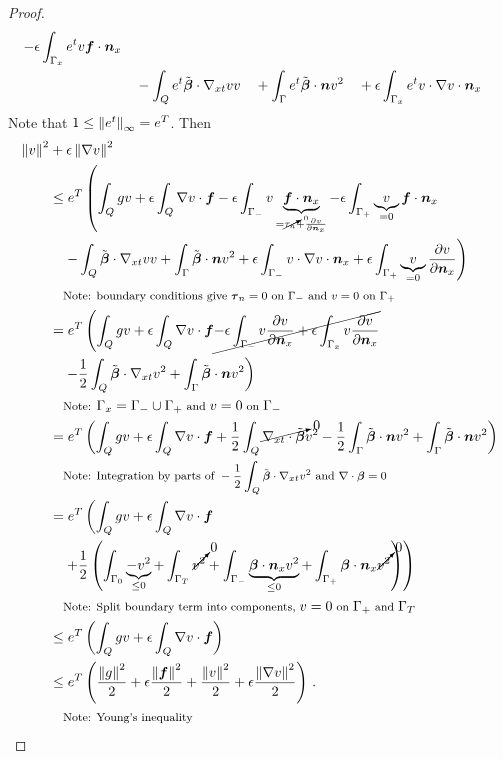 \documentclass[Dissertation.tex]{subfiles}
\begin{document}
\begin{proof}
\begin{align*}
-\epsilon\int_{\Gamma_x}e^{t}v\boldsymbol f\cdot\boldsymbol n_x\\
&\quad-\int_Qe^{t}\tilde{\boldsymbol\beta}\cdot\nabla_{xt} vv
\quad+\int_\Gamma e^{t}\tilde{\boldsymbol\beta}\cdot\boldsymbol n v^2
\quad+\epsilon\int_{\Gamma_x}e^{t}v\cdot\nabla v\cdot\boldsymbol n_x
\end{align*}
Note that $1\leq\left\| e^t \right\|_\infty=e^T$.
Then
\begin{align*}
\left\| v \right\|^2
&+\epsilon\left\| \nabla v \right\|^2
\\
&\leq
e^T\left(
\int_Qgv
+\epsilon\int_Q\nabla v\cdot\boldsymbol f
-\epsilon\int_{\Gamma_-}v\underbrace{\boldsymbol f\cdot\boldsymbol n_x}_{=\cancelto{0}{\tau_n}+\frac{\partial v}{\partial\boldsymbol n_x}}
-\epsilon\int_{\Gamma_+}\underbrace{v}_{=0}\boldsymbol f\cdot\boldsymbol n_x
\right.\\
&\left.
\quad-\int_Q\tilde{\boldsymbol\beta}\cdot\nabla_{xt} vv
+\int_\Gamma \tilde{\boldsymbol\beta}\cdot\boldsymbol n v^2
+\epsilon\int_{\Gamma_-}v\cdot\nabla v\cdot\boldsymbol n_x
+\epsilon\int_{\Gamma_+}\underbrace{v}_{=0}\frac{\partial v}{\partial\boldsymbol n_x}
\right)
\\
&\quad\footnotesize{\text{Note: boundary conditions give }\boldsymbol\tau_n=0\text{ on }\Gamma_-\text{ and }v=0\text{ on }\Gamma_+}
\\
&=
e^T\left(
\int_Qgv
+\epsilon\int_Q\nabla v\cdot\boldsymbol f
\cancel{
-\epsilon\int_{\Gamma_-}v\frac{\partial v}{\partial\boldsymbol n_x}
+\epsilon\int_{\Gamma_x}v\frac{\partial v}{\partial\boldsymbol n_x}
}
\right.\\
&\left.
\quad
-\frac{1}{2}\int_Q\tilde{\boldsymbol\beta}\cdot\nabla_{xt} v^2
+\int_\Gamma \tilde{\boldsymbol\beta}\cdot\boldsymbol n v^2
\right)
\\
&\quad\footnotesize{\text{Note: }\Gamma_x=\Gamma_-\cup\Gamma_+\text{ and }v=0\text{ on }\Gamma_-}
\\
&=
e^T\left(
\int_Qgv
+\epsilon\int_Q\nabla v\cdot\boldsymbol f
+\frac{1}{2}\int_Q\cancelto{0}{\nabla_{xt}\cdot\tilde{\boldsymbol\beta}} v^2
-\frac{1}{2}\int_\Gamma\tilde{\boldsymbol\beta}\cdot\boldsymbol n v^2
+\int_\Gamma \tilde{\boldsymbol\beta}\cdot\boldsymbol n v^2
\right)
\\
&\quad\footnotesize{\text{Note: Integration by parts of }-\frac{1}{2}\int_Q\tilde{\boldsymbol\beta}\cdot\ensuremath{\nabla_{xt}}v^2\text{ and }\ensuremath{\nabla\cdot}\boldsymbol\beta=0} 
\\
&=
e^T\left(
\int_Qgv
+\epsilon\int_Q\nabla v\cdot\boldsymbol f
\right.\\
&\left.
\quad
+\frac{1}{2}\left( \int_{\Gamma_0} \underbrace{-v^2}_{\leq 0}
+\int_{\Gamma_T} \cancelto{0}{v^2}
+\int_{\Gamma_-} \underbrace{\boldsymbol\beta\cdot\boldsymbol n_x v^2}_{\leq 0}
+\int_{\Gamma_+} \boldsymbol\beta\cdot\boldsymbol n_x \cancelto{0}{v^2}
 \right)
\right)
\\
&\quad\footnotesize{\text{Note: Split boundary term into components, }v=0\text{ on }\Gamma_+\text{ and }\Gamma_T} 
\\
&\leq
e^T\left(
\int_Qgv
+\epsilon\int_Q\nabla v\cdot\boldsymbol f
\right)
\\
&\leq
e^T\left(
\frac{\left\| g \right\|^2}{2}
+\epsilon\frac{\left\| \boldsymbol f \right\|^2}{2}
+\frac{\left\| v \right\|^2}{2}
+\epsilon\frac{\left\| \nabla v \right\|^2}{2}
\right)\,.
\\
&\quad\footnotesize{\text{Note: Young's inequality}}
\end{align*}
\end{proof}
\end{document}
